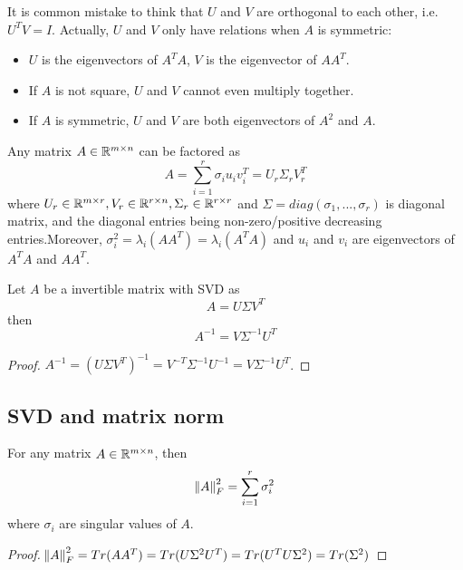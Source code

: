\begin{refsection}
\begin{remark}
It is common mistake to think that $U$ and $V$ are orthogonal to each other, i.e. $U^TV = I$. Actually, $U$ and $V$ only have relations when $A$ is symmetric:
\begin{itemize}
	\item $U$ is the eigenvectors of $A^TA$, $V$ is the eigenvector of $AA^T$.  
	\item If $A$ is not square, $U$ and $V$ cannot even multiply together. 
	\item If $A$ is symmetric, $U$ and $V$ are both eigenvectors of $A^2$ and $A$.
\end{itemize}
\end{remark}



\begin{corollary}
\cite[146]{calafiore2014optimization}Any matrix $A \in \mathbb{R}^{m\times n}$ can be factored as
$$A = \sum_{i=1}^r \sigma_i u_i v_i^T = U_r\Sigma_r V^T_r$$
where $U_r\in \mathbb{R}^{m\times r}, V_r\in \mathbb{R}^{r\times n}, \Sigma_r \in \mathbb{R}^{r\times r}$ and $\Sigma = diag(\sigma_1,...,\sigma_r)$ is diagonal matrix, and the diagonal entries being non-zero/positive decreasing entries.Moreover, $\sigma_i^2 = \lambda_i(AA^T) = \lambda_i(A^TA)$ and $u_i$ and $v_i$ are eigenvectors of $A^TA$ and $AA^T$.
\end{corollary}


\begin{lemma}
Let $A$ be a invertible matrix with SVD as
$$A = U\Sigma V^T$$
then
$$A^{-1} = V\Sigma^{-1}U^T$$
\end{lemma}
\begin{proof}
$A^{-1} = (U\Sigma V^T)^{-1} = V^{-T}\Sigma^{-1}U^{-1} = V\Sigma^{-1}U^T$.
\end{proof}






\subsection{SVD and matrix norm}
\begin{theorem}\label{ch:linearalgebra:th:matrixFrobniusnormsingularvalueeigenvalue}
For any matrix $A\in \mathbb{R}^{m\times n}$, then
$$\norm{A}_F^2 = \sum_{i=1}^r \sigma^2_i$$
where $\sigma_i$ are singular values of $A$.
\end{theorem}
\begin{proof}
$\norm{A}_F^2 = Tr(AA^T) = Tr(U\Sigma^2 U^T) = Tr(U^TU \Sigma^2) = Tr(\Sigma^2)$
\end{proof}



\end{refsection}
